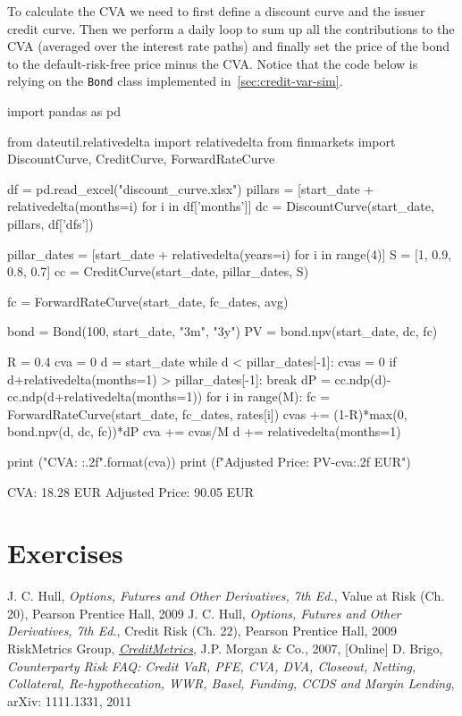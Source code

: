 To calculate the CVA we need to first define a discount curve and the issuer credit curve. Then we perform a daily loop to sum up all the contributions to the CVA (averaged over the interest rate paths) and finally set the price of the bond to the default-risk-free price minus the CVA.
Notice that the code below is relying on the \texttt{Bond} class implemented in~\ref{sec:credit-var-sim}.

\begin{ipython}
import pandas as pd

from dateutil.relativedelta import relativedelta
from finmarkets import DiscountCurve, CreditCurve, ForwardRateCurve

df = pd.read_excel("discount_curve.xlsx")
pillars = [start_date + relativedelta(months=i) for i in df['months']]
dc = DiscountCurve(start_date, pillars, df['dfs'])

pillar_dates = [start_date + relativedelta(years=i) for i in range(4)]
S = [1, 0.9, 0.8, 0.7]
cc = CreditCurve(start_date, pillar_dates, S)

fc = ForwardRateCurve(start_date, fc_dates, avg)

bond = Bond(100, start_date, "3m", "3y")
PV = bond.npv(start_date, dc, fc)

R = 0.4
cva = 0
d = start_date
while d < pillar_dates[-1]:
    cvas = 0
    if d+relativedelta(months=1) > pillar_dates[-1]:
        break
    dP = cc.ndp(d)-cc.ndp(d+relativedelta(months=1))
    for i in range(M):
        fc = ForwardRateCurve(start_date, fc_dates, rates[i])
        cvas += (1-R)*max(0, bond.npv(d, dc, fc))*dP
    cva += cvas/M
    d += relativedelta(months=1)

print ("CVA: {:.2f}".format(cva))	
print (f"Adjusted Price: {PV-cva:.2f} EUR")
\end{ipython}
\begin{ioutput}
CVA: 18.28 EUR
Adjusted Price: 90.05 EUR
\end{ioutput}

\section*{Exercises}


\begin{thebibliography}{9}
 J. C. Hull, \emph{Options, Futures and Other Derivatives, 7th Ed.}, Value at Risk (Ch. 20), Pearson Prentice Hall, 2009
 J. C. Hull, \emph{Options, Futures and Other Derivatives, 7th Ed.}, Credit Risk (Ch. 22), Pearson Prentice Hall, 2009
RiskMetrics Group, \href{https://www.msci.com/documents/10199/93396227-d449-4229-9143-24a94dab122f}{\emph{CreditMetrics}}, J.P. Morgan \& Co., 2007, [Online]
 D. Brigo, \emph{Counterparty Risk FAQ: Credit VaR, PFE, CVA, DVA, Closeout, Netting, Collateral, Re-hypothecation, WWR, Basel, Funding, CCDS and Margin Lending}, arXiv: 1111.1331, 2011
\end{thebibliography}
